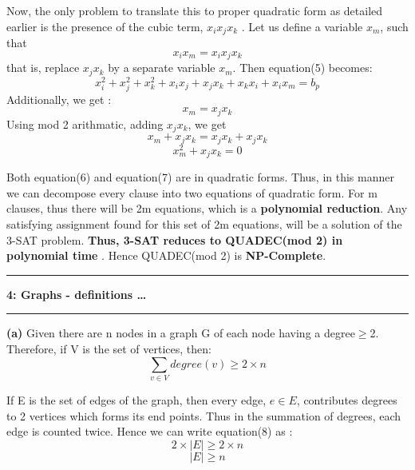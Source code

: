 \documentclass{article}
\newcommand\question[2]{\vspace{.25in}\hrule\textbf{#1: #2}\hrule\vspace{.10in}}
\renewcommand\part[1]{\vspace{.10in}\textbf{(#1)}}
\begin{document}
Now, the only problem to translate this to proper quadratic form as detailed earlier is the presence of the cubic term, $x_{i}x_{j}x_{k}$ . Let us define a variable $x_{m}$, such that \newline
\[ x_{i}x_{m} = x_{i}x_{j}x_{k} \]
that is, replace $x_{j}x_{k}$ by a separate variable $x_{m}$. Then equation(5) becomes: 
\begin{equation}
 x_{i}^2 + x_{j}^2 + x_{k}^2 + x_{i}x_{j} + x_{j}x_{k} + x_{k}x_{i} + x_{i}x_{m} = b_{p} 
\end{equation}
Additionally, we get :
\[ x_{m} = x_{j}x_{k}\]
Using mod 2 arithmatic, adding $x_{j}x_{k}$, we get
\[ x_{m} + x_{j}x_{k}= x_{j}x_{k} + x_{j}x_{k}\]
\begin{equation}
 x_{m}^2 + x_{j}x_{k}= 0
\end{equation}

Both equation(6) and equation(7) are in quadratic forms. Thus, in this manner we can decompose every clause into two equations of quadratic form. For m clauses, thus there will be 2m equations, which is a \textbf {polynomial reduction}. Any satisfying assignment found for this set of 2m equations, will be a solution of the 3-SAT problem. \newline
\textbf {Thus, 3-SAT reduces to QUADEC(mod 2) in polynomial time} . Hence QUADEC(mod 2) is \textbf {NP-Complete}.
\newline

\question{4}{Graphs - definitions \dots}

\part{a} Given there are n nodes in a graph G of each node having a degree$\geq$2. Therefore, if V is the set of vertices, then:\newline
\begin{equation}
 \sum_{v \in V} degree(v) \geq 2 \times n  
\end{equation}

If E is the set of edges of the graph, then every edge, $e \in E$, contributes degrees to 2 vertices which forms its end points. Thus in the summation of degrees, each edge is counted twice. Hence we can write equation(8) as :\newline
\[ 2 \times |E| \geq 2 \times n \]
\begin{equation}
 |E| \geq n
\end{equation}
\end{document}

